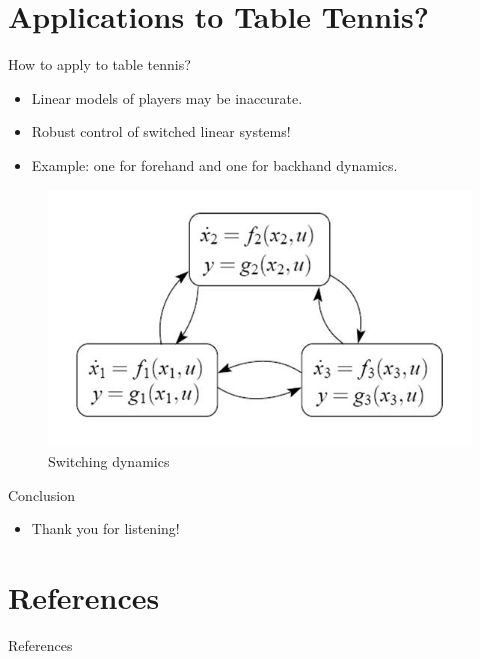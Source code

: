 \documentclass[handout]{beamer}
\begin{document}
\section{Applications to Table Tennis?}
%
\begin{frame}{How to apply to table tennis?}
\begin{itemize}
\item Linear models of players may be inaccurate.
\item Robust control of switched linear systems!
\item Example: one for forehand and one for backhand dynamics.
\end{itemize}
\begin{figure}
  \center
  \includegraphics[scale=0.5]{hybridSystem.jpg}
  \caption{Switching dynamics}			
\end{figure}
\end{frame}
%
\begin{frame}{Conclusion}
\begin{itemize}
\item Thank you for listening!
\end{itemize}
\end{frame}	
%
\section{References}
\begin{frame}[allowframebreaks]{References}
\def\newblock{\hskip .11em plus .33em minus .07em}

\end{frame}
%

%
\end{document}

